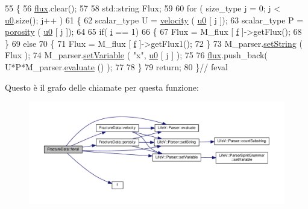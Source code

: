 \begin{DoxyCode}
55 \{
56     \hyperlink{confronto_8m_a96d7a28b6a4428be15fc1017d19343fa}{flux}.clear();
57 
58     std::string Flux;
59 
60     \textcolor{keywordflow}{for} ( size\_type j = 0; j < \hyperlink{god__e_8m_ae060ce5868d35ef17bcb6e832da03be9}{u0}.size(); j++ )
61     \{
62         scalar\_type U = \hyperlink{classFractureData_a9598cf66a822a593e819df754420a2c2}{velocity} ( \hyperlink{god__e_8m_ae060ce5868d35ef17bcb6e832da03be9}{u0} [ j ]);
63         scalar\_type P = \hyperlink{classFractureData_aab77ec8a8d3e878b5dfb72deb48841e7}{porosity} ( \hyperlink{god__e_8m_ae060ce5868d35ef17bcb6e832da03be9}{u0} [ j ]);
64 
65         \textcolor{keywordflow}{if}( \hyperlink{god__e_8m_a8604be5925f4266ab5ccc69675329c80}{i} == 1)
66         \{
67             Flux = M\_flux [ \hyperlink{god__e_8m_a68f477f9b30a6300d5af9b02eac82f35}{f} ]->getFlux();
68         \}
69         \textcolor{keywordflow}{else}
70         \{
71             Flux = M\_flux [ \hyperlink{god__e_8m_a68f477f9b30a6300d5af9b02eac82f35}{f} ]->getFlux1();
72         \}
73         M\_parser.\hyperlink{classLifeV_1_1Parser_ac05769e836a0dc95d9c020df361a5194}{setString} ( Flux );
74         M\_parser.\hyperlink{classLifeV_1_1Parser_aa2b362e12b8feb60231705d499c9fbae}{setVariable} ( \textcolor{stringliteral}{"x"}, \hyperlink{god__e_8m_ae060ce5868d35ef17bcb6e832da03be9}{u0} [ j ] );
75 
76         \hyperlink{confronto_8m_a96d7a28b6a4428be15fc1017d19343fa}{flux}.push\_back( U*P*M\_parser.\hyperlink{classLifeV_1_1Parser_a51d84fd4ae6d420620e7beee58fad673}{evaluate} () );
77 
78     \}
79     \textcolor{keywordflow}{return};
80 \}\textcolor{comment}{// feval}
\end{DoxyCode}


Questo è il grafo delle chiamate per questa funzione\-:
\nopagebreak
\begin{figure}[H]
\begin{center}
\leavevmode
\includegraphics[width=350pt]{classFractureData_a49671c83ba3f6501803913c224177a72_cgraph}
\end{center}
\end{figure}


